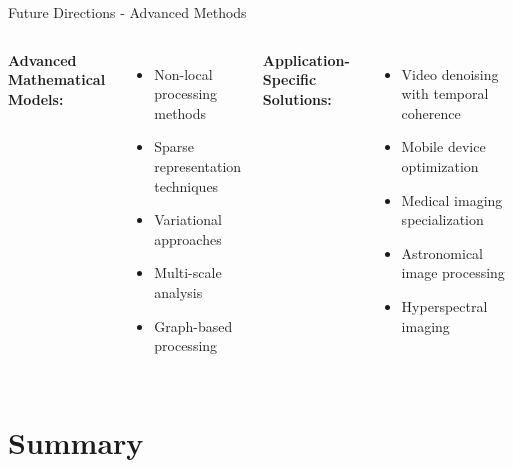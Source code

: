 \documentclass[aspectratio=169,10pt]{beamer}
\begin{document}
\begin{frame}{Future Directions - Advanced Methods}
\begin{columns}
\textbf{Advanced Mathematical Models:}
\begin{itemize}
\item Non-local processing methods
\item Sparse representation techniques
\item Variational approaches
\item Multi-scale analysis
\item Graph-based processing
\end{itemize}

\textbf{Application-Specific Solutions:}
\begin{itemize}
\item Video denoising with temporal coherence
\item Mobile device optimization
\item Medical imaging specialization
\item Astronomical image processing
\item Hyperspectral imaging
\end{itemize}
\end{columns}
\end{frame}

\section{Summary}
\end{document}
